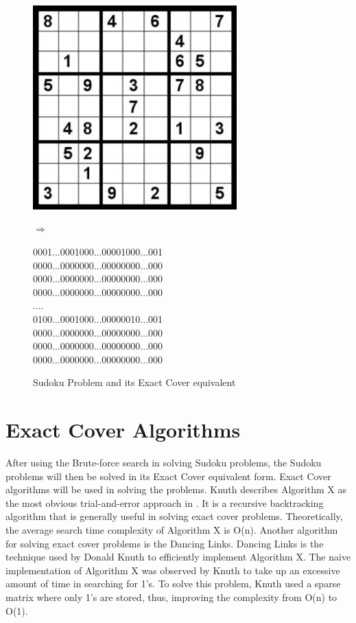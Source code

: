 \documentclass[a4paper,oneside,11pt]{report}
\begin{document}
\begin{figure}[h]
\begin{minipage}{0.5\textwidth}
{\includegraphics[width=0.7\textwidth]{sampleduko.jpg}}
\newline
\end{minipage}
\hspace*{-1cm}$\Rightarrow$\hspace{1cm}
\begin{minipage}{0.5\textwidth}
0001...0001000...00001000...001\\
0000...0000000...00000000...000\\
0000...0000000...00000000...000\\
0000...0000000...00000000...000\\
....\\
0100...0001000...00000010...001\\
0000...0000000...00000000...000\\
0000...0000000...00000000...000\\
0000...0000000...00000000...000\\
\end{minipage}
\caption{Sudoku Problem and its Exact Cover equivalent}
\end{figure}

\newpage
\section{Exact Cover Algorithms}
After using the Brute-force search in solving Sudoku problems, the Sudoku problems will then be solved in its Exact Cover equivalent form. Exact Cover algorithms will be used in solving the problems. Knuth describes Algorithm X as the most obvious trial-and-error approach in \cite{Knuth}. It is a recursive backtracking algorithm that is generally useful in solving exact cover problems. Theoretically, the average search time complexity of Algorithm X is O(n). Another algorithm for solving exact cover problems is the Dancing Links. Dancing Links is the technique used by Donald Knuth to efficiently implement Algorithm X. The naive implementation of Algorithm X was observed by Knuth to take up an excessive amount of time in searching for 1’s. To solve this problem, Knuth used a sparse matrix where only 1’s are stored, thus, improving the complexity from O(n) to O(1).
\end{document}
